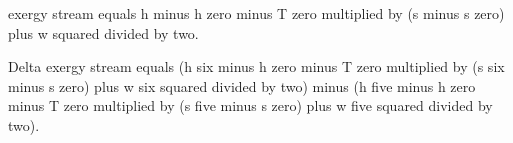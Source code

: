 exergy stream equals h minus h zero minus T zero multiplied by (s minus s zero) plus w squared divided by two.  

Delta exergy stream equals (h six minus h zero minus T zero multiplied by (s six minus s zero) plus w six squared divided by two) minus (h five minus h zero minus T zero multiplied by (s five minus s zero) plus w five squared divided by two).